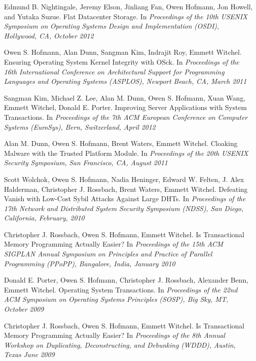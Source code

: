 \documentclass[10pt]{article}
\makeatletter
\newlength{\bibhang}
\newlength{\bibsep}
 {\@listi \global\bibsep\itemsep \global\advance\bibsep by\parsep}
\newenvironment{bibsection}
    {\list{}{%
        \setlength{\leftmargin}{\bibhang}%
        \setlength{\itemindent}{-\leftmargin}%
        \setlength{\itemsep}{\bibsep}%
        \setlength{\parsep}{\z@}%
        }}
    {\endlist}
\makeatother
\begin{document}
\begin{bibsection}

\item Edmund B. Nightingale, Jeremy Elson, Jinliang Fan, Owen Hofmann, Jon
Howell, and Yutaka Suzue.
Flat Datacenter Storage. 
In \emph{Proceedings of the 10th USENIX Symposium on Operating Systems
Design and Implementation (OSDI), Hollywood, CA, October 2012}

\item Owen S. Hofmann, Alan Dunn, Sangman Kim, Indrajit Roy, Emmett Witchel.
Ensuring Operating System Kernel Integrity with OSck.
In \emph{Proceedings of the 16th International Conference on Architectural
Support for Programming Languages and Operating Systems (ASPLOS), Newport
Beach, CA, March 2011} 

\item Sangman Kim, Michael Z. Lee, Alan M. Dunn, Owen S. Hofmann, Xuan
Wang, Emmett Witchel, Donald E. Porter.
Improving Server Applications with System Transactions.
In \emph{Proceedings of the 7th ACM European Conference on Computer Systems
(EuroSys), Bern, Switzerland, April 2012}

\item Alan M. Dunn, Owen S. Hofmann, Brent Waters, Emmett Witchel.
Cloaking Malware with the Trusted Platform Module.
In \emph{Proceedings of the 20th USENIX Security Symposium, San Francisco,
CA, August 2011}

\item Scott Wolchok, Owen S. Hofmann,  Nadia Heninger,  Edward W. Felten,
J. Alex Halderman, Christopher J. Rossbach, Brent Waters, Emmett Witchel.
Defeating Vanish with Low-Cost Sybil Attacks Against Large DHTs.
 In \emph{Proceedings of the 17th Network and Distributed System Security
Symposium (NDSS), San Diego, California, February, 2010}


\item Christopher J. Rossbach, Owen S. Hofmann, Emmett Witchel.
Is Transactional Memory Programming Actually Easier?
In \emph{Proceedings of the  15th ACM SIGPLAN Annual Symposium on
Principles and Practice of Parallel Programming (PPoPP), Bangalore, India,
January 2010} 
 
\item Donald E. Porter, Owen S. Hofmann, Christopher J. Rossbach, Alexander
Benn, Emmett Witchel.
Operating System Transactions.
In \emph{Proceedings of the 22nd ACM Symposium on Operating Systems
Principles (SOSP), Big Sky, MT, October 2009} 
 
\item Christopher J. Rossbach, Owen S. Hofmann, Emmett Witchel.
Is Transactional Memory Programming Actually Easier?
In \emph{Proceedings of the  8th Annual Workshop on Duplicating,
Deconstructing, and Debunking (WDDD), Austin, Texas June 2009} 
 

\end{bibsection}
\end{document}
